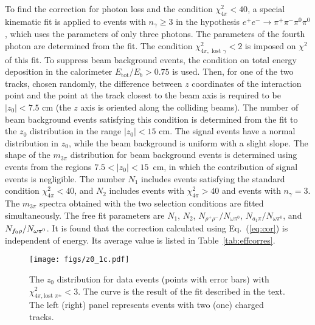 \documentclass[twocolumn,aps,prd,floatfix,nofootinbib,superscriptaddress]{revtex4-2}
\def\mbb{\linebreak[0]}
\begin{document}
To find the correction for photon loss and the condition \( \chi^2_{4\pi} < 40 \), a special kinematic fit is applied to events with \( n_\gamma \geq 3 \) in the hypothesis \( e^+e^- \to \pi^+\pi^-\pi^0\pi^0 \), which uses the parameters of only three photons.
The parameters of the fourth photon are determined from the fit.
The condition \( \chi^2_{4\pi,\text{ lost }\gamma} < 2 \) is imposed on $\chi^2$ of this fit.
To suppress beam background events, the condition on total energy deposition in the calorimeter \( E_\text{tot} / E_b > 0.75 \) is used.
Then, for one of the two tracks, chosen randomly, the difference between $z$ coordinates of the interaction point and the point at the track closest to the beam axis is required to be \( |z_0| < 7.5 \) cm (the $z$ axis is oriented along the colliding beams).
The number of beam background events satisfying this condition is determined from the fit to the $z_0$ distribution in the range \( |z_0| < 15 \) cm.
The signal events have a normal distribution in $z_0$, while the beam background is uniform with a slight slope.
The shape of the $m_{3\pi}$ distribution for beam background events is determined using events from the regions \( 7.5 < |z_0| < 15 \)~cm, in which the contribution of signal events is negligible.
The number $N_1$ includes events satisfying the standard condition \( \chi^2_{4\pi} < 40 \), and $N_2$ includes events with \( \chi^2_{4\pi} > 40 \) and events with \( n_\gamma = 3 \).
The $m_{3\pi}$ spectra obtained with the two selection conditions are fitted simultaneously.
The free fit parameters are $N_1$, $N_2$, \( N_{\rho^+\rho^-} / N_{\omega\pi^0} \), \( N_{a_1\pi} / N_{\omega\pi^0} \), and \( N_{f_0\rho} /\mbb N_{\omega\pi^0} \).
It is found that the correction calculated using Eq.~(\ref{eq:cor}) is independent of energy.
Its average value is listed in Table~\ref{tab:effcorres}.

\begin{figure}
\centering
\texttt{[image: figs/z0\_1c.pdf]}
\caption{
	The $z_0$ distribution for data events (points with error bars) with \( \chi^2_{4\pi,\text{lost }\pi^\pm} < 3 \).
	The curve is the result of the fit described in the text.
	The left (right) panel represents events with two (one) charged tracks.
}
\label{fig:z0_1c}
\end{figure}
\end{document}
